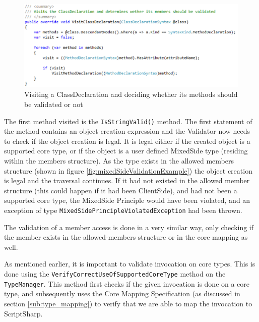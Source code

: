 \begin{figure}[H]
	\begin{center}
		\centerline{\includegraphics[width=14cm]{resources/images/ValidatorVisitClassDeclaration.png}}
	\end{center}
	\caption{Visiting a ClassDeclaration and deciding whether its methods should be validated or not}
	\label{fig:ValidatorVisitClassDeclaration}
\end{figure}

The first method visited is the \texttt{IsStringValid()} method. The first statement of the method contains an object creation expression and the Validator now needs to check if the object creation is legal. It is legal either if the created object is a supported core type, or if the object is a user defined MixedSide type (residing within the members structure). As the type exists in the allowed members structure (shown in figure \ref{fig:mixedSideValidationExample}) the object creation is legal and the traversal continues. If it had not existed in the allowed member structure (this could happen if it had been ClientSide), and had not been a supported core type, the MixedSide Principle would have been violated, and an exception of type \texttt{MixedSidePrincipleViolatedException} had been thrown.

The validation of a member access is done in a very similar way, only checking if the member exists in the allowed-members structure or in the core mapping as well.

As mentioned earlier, it is important to validate invocation on core types. This is done using the \texttt{VerifyCorrectUseOfSupportedCoreType} method on the \texttt{TypeManager}. This method first checks if the given invocation is done on a core type, and subsequently uses the Core Mapping Specification (as discussed in section \ref{sub:type_mapping}) to verify that we are able to map the invocation to ScriptSharp.
		





